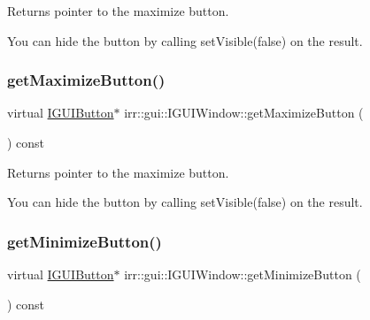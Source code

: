 Returns pointer to the maximize button. 

You can hide the button by calling set\+Visible(false) on the result. \mbox{\label{classirr_1_1gui_1_1IGUIWindow_a7b5976907664ed8603f3a603079d3b15}} 
\subsubsection{\texorpdfstring{get\+Maximize\+Button()}{getMaximizeButton()}\hspace{0.1cm}{\footnotesize\ttfamily [2/2]}}
{\footnotesize\ttfamily virtual \hyperlink{classirr_1_1gui_1_1IGUIButton}{I\+G\+U\+I\+Button}$\ast$ irr\+::gui\+::\+I\+G\+U\+I\+Window\+::get\+Maximize\+Button (\begin{DoxyParamCaption}{ }\end{DoxyParamCaption}) const\hspace{0.3cm}{\ttfamily [pure virtual]}}



Returns pointer to the maximize button. 

You can hide the button by calling set\+Visible(false) on the result. \mbox{\label{classirr_1_1gui_1_1IGUIWindow_a9c9b5060ca57c46bfece1339ef30facb}} 
\subsubsection{\texorpdfstring{get\+Minimize\+Button()}{getMinimizeButton()}\hspace{0.1cm}{\footnotesize\ttfamily [1/2]}}
{\footnotesize\ttfamily virtual \hyperlink{classirr_1_1gui_1_1IGUIButton}{I\+G\+U\+I\+Button}$\ast$ irr\+::gui\+::\+I\+G\+U\+I\+Window\+::get\+Minimize\+Button (\begin{DoxyParamCaption}{ }\end{DoxyParamCaption}) const\hspace{0.3cm}{\ttfamily [pure virtual]}}



